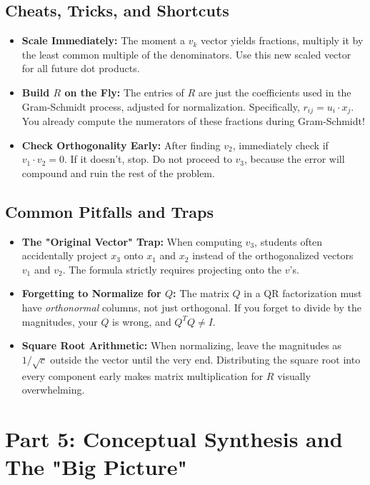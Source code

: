 \documentclass[11pt, letterpaper]{article}
\theoremstyle{definition}
\theoremstyle{remark}
\begin{document}
\subsection{Cheats, Tricks, and Shortcuts}
\begin{itemize}
    \item \textbf{Scale Immediately:} The moment a $v_k$ vector yields fractions, multiply it by the least common multiple of the denominators. Use this new scaled vector for all future dot products.
    \item \textbf{Build $R$ on the Fly:} The entries of $R$ are just the coefficients used in the Gram-Schmidt process, adjusted for normalization. Specifically, $r_{ij} = u_i \cdot x_j$. You already compute the numerators of these fractions during Gram-Schmidt!
    \item \textbf{Check Orthogonality Early:} After finding $v_2$, immediately check if $v_1 \cdot v_2 = 0$. If it doesn't, stop. Do not proceed to $v_3$, because the error will compound and ruin the rest of the problem.
\end{itemize}

\subsection{Common Pitfalls and Traps}
\begin{itemize}
    \item \textbf{The "Original Vector" Trap:} When computing $v_3$, students often accidentally project $x_3$ onto $x_1$ and $x_2$ instead of the orthogonalized vectors $v_1$ and $v_2$. The formula strictly requires projecting onto the $v$'s.
    \item \textbf{Forgetting to Normalize for $Q$:} The matrix $Q$ in a QR factorization must have \textit{orthonormal} columns, not just orthogonal. If you forget to divide by the magnitudes, your $Q$ is wrong, and $Q^T Q \neq I$.
    \item \textbf{Square Root Arithmetic:} When normalizing, leave the magnitudes as $1/\sqrt{c}$ outside the vector until the very end. Distributing the square root into every component early makes matrix multiplication for $R$ visually overwhelming.
\end{itemize}

\newpage
\section{Part 5: Conceptual Synthesis and The "Big Picture"}
\end{document}

